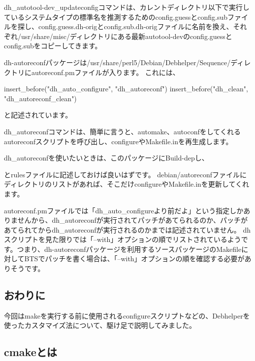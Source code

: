 \documentclass[mingoth,a4paper]{jsarticle}
\begin{document}
dh\_autotool-dev\_updateconfigコマンドは、カレントディレクトリ以下で実行しているシステムタイプの標準名を推測するためのconfig.guessとconfig.subファイルを探し、config.guess.dh-origとconfig.sub.dh-origファイルに名前を換え、それぞれ/usr/share/misc/ディレクトリにある最新autotool-devのconfig.guessとconfig.subをコピーしてきます。

dh-autoreconfパッケージは/usr/share/perl5/Debian/Debhelper/Sequence/ディレクトリにautoreconf.pmファイルが入ります。
これには、
\begin{commandline}
insert_before("dh_auto_configure", "dh_autoreconf")
insert_before("dh_clean", "dh_autoreconf_clean")
\end{commandline}
と記述されています。

dh\_autoreconfコマンドは、簡単に言うと、automake、autoconfをしてくれるautoreconfスクリプトを呼び出し、configureやMakefile.inを再生成します。

dh\_autoreconfを使いたいときは、このパッケージにBuild-depし、
とrulesファイルに記述しておけば良いはずです。
debian/autoreconfファイルにディレクトリのリストがあれば、そこだけconfigureやMakefile.inを更新してくれます。

autoreconf.pmファイルでは「dh\_auto\_configureより前だよ」という指定しかありませんから、dh\_autoreconfが実行されてパッチがあてられるのか、パッチがあてられてからdh\_autoreconfが実行されるのかまでは記述されていません。
dhスクリプトを見た限りでは「--with」オプションの順でリストされているようです。つまり、dh-autoreconfパッケージを利用するソースパッケージのMakefileに対してBTSでパッチを書く場合は、「--with」オプションの順を確認する必要がありそうです。

\subsection{おわりに}

今回はmakeを実行する前に使用されるconfigureスクリプトなどの、Debhelperを使ったカスタマイズ法について、駆け足で説明してみました。



\subsection{cmakeとは}
\end{document}
